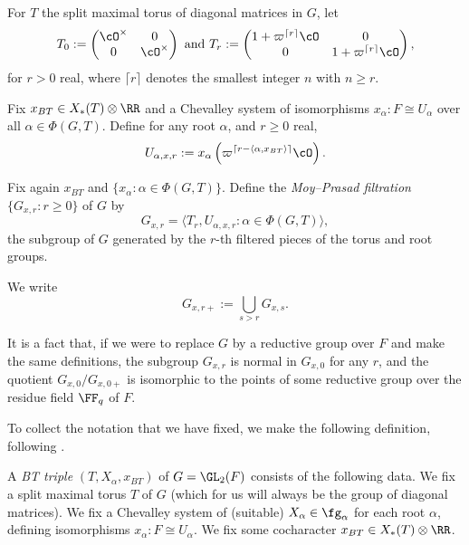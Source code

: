 \begin{notn}
    For $T$ the split maximal torus of diagonal matrices in $G$, let 
    $$T_0 := \begin{pmatrix}
        \cO^\times & 0 \\ 0 & \cO^\times
    \end{pmatrix} \text{ and } T_r := \begin{pmatrix}
        1+\varpi^{\lceil r \rceil}\cO & 0 \\ 0 & 1+ \varpi^{\lceil r\rceil}\cO
    \end{pmatrix},$$
    for $r>0$ real, where $\lceil r \rceil$ denotes the smallest integer $n$ with $n\geq r$.
\end{notn}

\begin{notn}
    Fix $x_{BT} \in X_*(T) \otimes \RR$ and a Chevalley system of isomorphisms $x_\alpha: F \cong U_\alpha$ over all $\alpha \in \Phi(G,T)$. Define for any root $\alpha$, and $r \geq 0$ real,
    $$U_{\alpha,x,r} := x_\alpha\left(\varpi^{\lceil r - \langle \alpha, x_{BT}\rangle \rceil} \cO \right).$$
\end{notn}

\begin{defn}
    Fix again $x_{BT}$ and $\{x_\alpha : \alpha \in \Phi(G,T)\}$. Define the \textit{Moy--Prasad filtration} $\{G_{x,r}: r \geq 0\}$ of $G$ by 
    $$G_{x,r} = \langle T_r, U_{\alpha,x,r} : \alpha \in \Phi(G,T)\rangle,$$
    the subgroup of $G$ generated by the $r$-th filtered pieces of the torus and root groups. 
\end{defn}

\begin{notn}
    We write
    $$G_{x,r+} := \bigcup\limits_{s>r} G_{x,s}.$$
\end{notn}

\begin{rem}
    It is a fact that, if we were to replace $G$ by a reductive group over $F$ and make the same definitions, the subgroup $G_{x,r}$ is normal in $G_{x,0}$ for any $r$, and the quotient $G_{x,0}/G_{x,0+}$ is isomorphic to the points of some reductive group over the residue field $\FF_q$ of $F$.
\end{rem}

To collect the notation that we have fixed, we make the following definition, following \cite{Fin1}.

\begin{defn}
    A \textit{BT triple} $(T,X_\alpha,x_{BT})$ of $G=\GL_2(F)$ consists of the following data. We fix a split maximal torus $T$ of $G$ (which for us will always be the group of diagonal matrices). We fix a Chevalley system of (suitable) $X_\alpha \in \fg_\alpha$ for each root $\alpha$, defining isomorphisms $x_\alpha: F \cong U_\alpha$. We fix some cocharacter $x_{BT} \in X_*(T) \otimes \RR$.
\end{defn}

